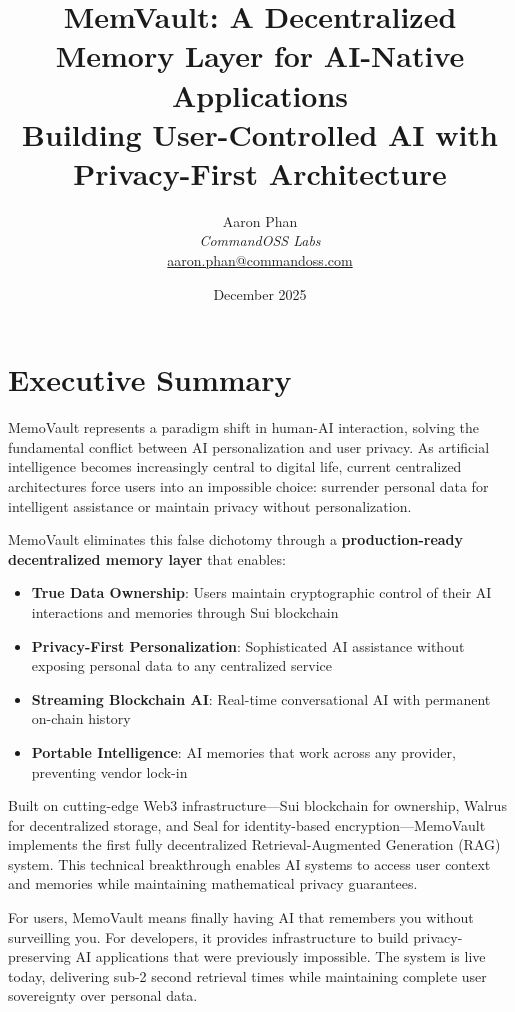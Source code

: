 \documentclass[12pt, a4paper]{article}
\title{\textbf{MemVault: A Decentralized Memory Layer for AI-Native Applications}\\
\vspace{0.5cm}
\large Building User-Controlled AI with Privacy-First Architecture}
\author{
Aaron Phan\\
\textit{CommandOSS Labs}\\
\href{mailto:aaron.phan@commandoss.com}{aaron.phan@commandoss.com}
}
\date{December 2025}
\begin{document}
\maketitle
\thispagestyle{empty}

\newpage
\tableofcontents
\thispagestyle{empty}

\newpage
\section{Executive Summary}

MemoVault represents a paradigm shift in human-AI interaction, solving the fundamental conflict between AI personalization and user privacy. As artificial intelligence becomes increasingly central to digital life, current centralized architectures force users into an impossible choice: surrender personal data for intelligent assistance or maintain privacy without personalization.

MemoVault eliminates this false dichotomy through a \textbf{production-ready decentralized memory layer} that enables:

\begin{itemize}
    \item \textbf{True Data Ownership}: Users maintain cryptographic control of their AI interactions and memories through Sui blockchain
    \item \textbf{Privacy-First Personalization}: Sophisticated AI assistance without exposing personal data to any centralized service
    \item \textbf{Streaming Blockchain AI}: Real-time conversational AI with permanent on-chain history
    \item \textbf{Portable Intelligence}: AI memories that work across any provider, preventing vendor lock-in
\end{itemize}

Built on cutting-edge Web3 infrastructure—Sui blockchain for ownership, Walrus for decentralized storage, and Seal for identity-based encryption—MemoVault implements the first fully decentralized Retrieval-Augmented Generation (RAG) system. This technical breakthrough enables AI systems to access user context and memories while maintaining mathematical privacy guarantees.

For users, MemoVault means finally having AI that remembers you without surveilling you. For developers, it provides infrastructure to build privacy-preserving AI applications that were previously impossible. The system is live today, delivering sub-2 second retrieval times while maintaining complete user sovereignty over personal data.
\newpage
\end{document}
